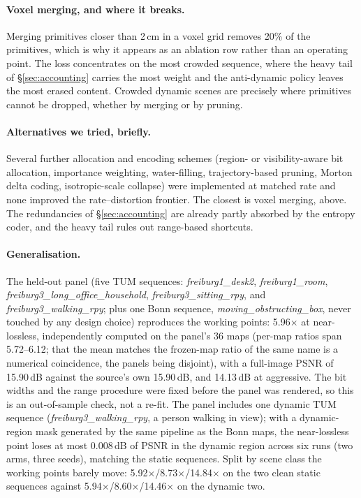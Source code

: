 \documentclass[10pt,twocolumn,letterpaper]{article}
\newcommand{\gate}[1]{{#1}} %
\begin{document}
\paragraph{Voxel merging, and where it breaks.}
Merging primitives closer than \gate{2\,cm} in a voxel grid removes \gate{20\%} of the
primitives, which is why it appears as an ablation row rather than an operating point. %
 The loss concentrates on the most crowded sequence, where the heavy tail of
\S\ref{sec:accounting} carries the most weight and the anti-dynamic policy leaves the most erased
content. Crowded dynamic scenes are precisely where primitives cannot be
dropped, whether by merging or by pruning.

\paragraph{Alternatives we tried, briefly.}
Several further allocation and encoding schemes (region- or visibility-aware bit
allocation, importance weighting, water-filling, trajectory-based pruning, Morton
delta coding, isotropic-scale collapse) were implemented at matched rate and none
improved the rate--distortion frontier. %
The closest is voxel merging, above. The redundancies of \S\ref{sec:accounting} are
already partly absorbed by the entropy coder, and the heavy tail rules out range-based
shortcuts.

\paragraph{Generalisation.}
The held-out panel (five TUM sequences: \emph{freiburg1\_desk2}, \emph{freiburg1\_room},
\emph{freiburg3\_long\_office\_household}, \emph{freiburg3\_sitting\_rpy}, and
\emph{freiburg3\_walking\_rpy}; plus one Bonn sequence, \emph{moving\_obstructing\_box},
never touched by any design choice) reproduces the working points: \gate{5.96$\times$} at near-lossless,
independently computed on the panel's 36 maps (per-map ratios span
\gate{5.72--6.12}; that the mean matches the frozen-map ratio of the same name is a
numerical coincidence, the panels being disjoint), with a full-image PSNR of
\gate{15.90}\,dB against the source's own \gate{15.90}\,dB,
and \gate{14.13}\,dB at aggressive. %
 The bit widths and the range procedure were fixed before the panel was rendered, so this
is an out-of-sample check, not a re-fit. The panel includes one dynamic TUM sequence
(\emph{freiburg3\_walking\_rpy}, a person walking in view); with a dynamic-region mask
generated by the same pipeline as the Bonn maps, the near-lossless point loses at most
\gate{0.008}\,dB of PSNR in the dynamic region across six runs (two arms, three seeds),
matching the static sequences. %
Split by scene class the working points barely move: \gate{5.92$\times$}/\gate{8.73$\times$}/\gate{14.84$\times$}
on the two clean static sequences against \gate{5.94$\times$}/\gate{8.60$\times$}/\gate{14.46$\times$} on the dynamic two.
\end{document}
